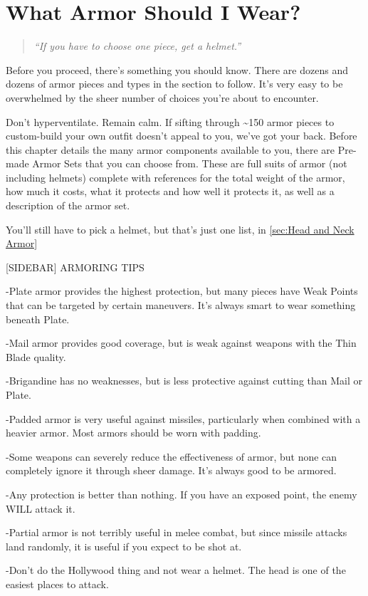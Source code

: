 \documentclass[oneside,11pt,english]{book}
\begin{document}
\section{What Armor Should I Wear?}
\begin{quote}
  \centering
  \emph{“If you have to choose one piece, get a helmet.”}
\end{quote}
Before you proceed, there’s something you should know. There are dozens and dozens of armor pieces and types in 
the section to follow. It’s very easy to be overwhelmed by the sheer number of choices you’re about to encounter. 

Don’t hyperventilate. Remain calm. If sifting through \textasciitilde150 armor pieces to custom-build your own outfit doesn’t
appeal to you, we’ve got your back. Before this chapter details the many armor components available to you, there are
Pre-made Armor Sets that you can choose from. These are full suits of armor (not including helmets) complete with 
references for the total weight of the armor, how much it costs, what it protects and how well it protects it, as well as a description of the armor set.

You’ll still have to pick a helmet, but that’s just one list, in \autoref{sec:Head and Neck Armor}

[SIDEBAR] ARMORING TIPS %

-Plate armor provides the highest protection, but many pieces have Weak Points that can be targeted by certain 
maneuvers. It’s always smart to wear something beneath Plate.

-Mail armor provides good coverage, but is weak against weapons with the Thin Blade quality.

-Brigandine has no weaknesses, but is less protective against cutting than Mail or Plate.

-Padded armor is very useful against missiles, particularly when combined with a heavier armor. Most armors should be worn with padding.

-Some weapons can severely reduce the effectiveness of armor, but none can completely ignore it through sheer 
damage. It’s always good to be armored.

-Any protection is better than nothing. If you have an exposed point, the enemy WILL attack it. 

-Partial armor is not terribly useful in melee combat, but since missile attacks land randomly, it is useful if you expect to be shot at.

-Don’t do the Hollywood thing and not wear a helmet. The head is one of the easiest places to attack.
\end{document}
